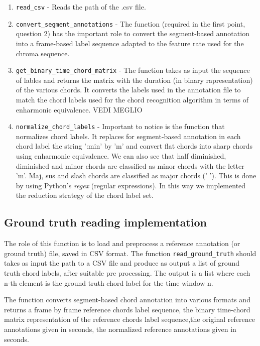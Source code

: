 \documentclass[
	12pt, %
]{fphw}
\begin{document}
\begin{enumerate}
	\item \verb|read_csv| - Reads the path of the .csv file.
	\item \verb|convert_segment_annotations| - The function (required in the first point, question 2) has the important role to convert the segment-based annotation into a frame-based label sequence adapted to the feature rate used for the chroma sequence.
	\item \verb|get_binary_time_chord_matrix| - The function takes as input the sequence of lables and returns the matrix with the duration (in binary rapresentation) of the various chords. It converts the labels used in the annotation file to match the chord labels used for the chord recognition
algorithm in terms of enharmonic equivalence.
\color{red} VEDI MEGLIO \color{black}
	\item \verb|normalize_chord_labels| - Important to notice is the function that normalizes chord labels. It replaces for segment-based annotation in each chord label the string ':min' by 'm' and convert flat chords into sharp chords using enharmonic equivalence. We can also see that half diminished, diminished and minor chords are classified as minor chords with the letter 'm'. Maj, sus and slash  chords are classified as major chords (' '). This is done by using Python's \textit{regex} (regular expressions). In this way we implemented the reduction strategy of the chord label set.
\end{enumerate}

\subsection*{Ground truth reading implementation}

The role of this function is to load and preprocess a reference annotation (or ground truth) file, saved in CSV format. The function \verb|read_ground_truth| should takes as input the path to a CSV file and produce as output a list of ground truth chord labels, after suitable pre processing. The output is a list where each n-th element is the ground truth chord label for the time window n. 

The function converts segment-based chord annotation into various formats and returns a frame by frame reference chords label sequence, the binary time-chord matrix representation of the reference chords label sequence,the original reference annotations given in seconds, the normalized reference annotations given in seconds.
\end{document}
